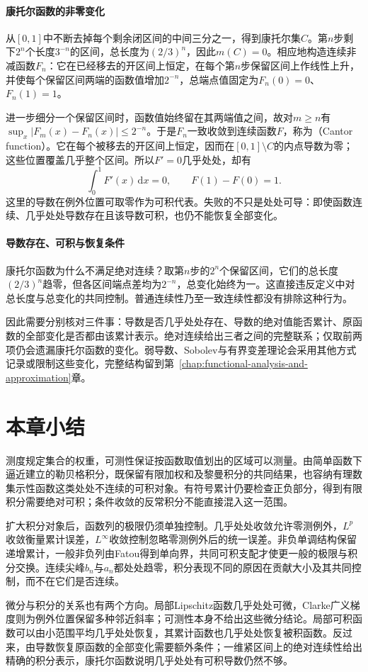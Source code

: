 \paragraph{康托尔函数的非零变化}

从$[0,1]$中不断去掉每个剩余闭区间的中间三分之一，得到康托尔集$C$。第$n$步剩下$2^n$个长度$3^{-n}$的区间，总长度为$(2/3)^n$，因此$m(C)=0$。相应地构造连续非减函数$F_n$：它在已经移去的开区间上恒定，在每个第$n$步保留区间上作线性上升，并使每个保留区间两端的函数值增加$2^{-n}$，总端点值固定为$F_n(0)=0$、$F_n(1)=1$。

进一步细分一个保留区间时，函数值始终留在其两端值之间，故对$m\geq n$有$\sup_x|F_m(x)-F_n(x)|\leq2^{-n}$。于是$F_n$一致收敛到连续函数$F$，称为（Cantor function）。它在每个被移去的开区间上恒定，因而在$[0,1]\setminus C$的内点导数为零；这些位置覆盖几乎整个区间。所以$F'=0$几乎处处，却有
\[
 \int_0^1F'(x)\,\mathrm dx=0,\qquad F(1)-F(0)=1.
\]
这里的导数在例外位置可取零作为可积代表。失败的不只是处处可导：即使函数连续、几乎处处导数存在且该导数可积，也仍不能恢复全部变化。

\paragraph{导数存在、可积与恢复条件}

康托尔函数为什么不满足绝对连续？取第$n$步的$2^n$个保留区间，它们的总长度$(2/3)^n$趋零，但各区间端点差均为$2^{-n}$，总变化始终为一。这直接违反定义中对总长度与总变化的共同控制。普通连续性乃至一致连续性都没有排除这种行为。

因此需要分别核对三件事：导数是否几乎处处存在、导数的绝对值能否累计、原函数的全部变化是否都由该累计表示。绝对连续给出三者之间的完整联系；仅取前两项仍会遗漏康托尔函数的变化。弱导数、Sobolev与有界变差理论会采用其他方式记录或限制这些变化，完整结构留到第~\ref{chap:functional-analysis-and-approximation}章。

\section{本章小结}
\label{sec:measurable-summary}

测度规定集合的权重，可测性保证按函数取值划出的区域可以测量。由简单函数下逼近建立的勒贝格积分，既保留有限加权和及黎曼积分的共同结果，也容纳有理数集示性函数这类处处不连续的可积对象。有符号累计仍要检查正负部分，得到有限积分需要绝对可积；条件收敛的反常积分不能直接混入这一范围。

扩大积分对象后，函数列的极限仍须单独控制。几乎处处收敛允许零测例外，$L^p$收敛衡量累计误差，$L^\infty$收敛控制忽略零测例外后的统一误差。非负单调结构保留递增累计，一般非负列由Fatou得到单向界，共同可积支配才使更一般的极限与积分交换。连续尖峰$b_n$与$a_n$都处处趋零，积分表现不同的原因在贡献大小及其共同控制，而不在它们是否连续。

微分与积分的关系也有两个方向。局部Lipschitz函数几乎处处可微，Clarke广义梯度则为例外位置保留多种邻近斜率；可测性本身不给出这些微分结论。局部可积函数可以由小范围平均几乎处处恢复，其累计函数也几乎处处恢复被积函数。反过来，由导数恢复原函数的全部变化需要额外条件；一维紧区间上的绝对连续性给出精确的积分表示，康托尔函数说明几乎处处有可积导数仍然不够。
